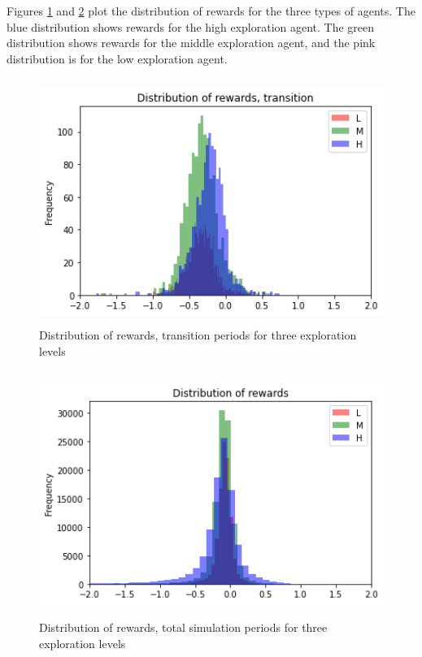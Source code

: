 \documentclass[hidelinks]{article}
\begin{document}
Figures \ref{rewards_t} and \ref{rewards} plot the distribution of rewards for the three types of agents. The blue distribution shows rewards for the high exploration agent. The green distribution shows rewards for the middle exploration agent, and the pink distribution is for the low exploration agent.  

\begin{figure}[H]
	\caption{Distribution of rewards, transition periods for three exploration levels}
	\centerline{\includegraphics[width=12cm,height=8cm]{reward_transition.png}}
	\label{rewards_t}
\end{figure}

\begin{figure}[H]
	\caption{Distribution of rewards, total simulation periods for three exploration levels}
	\centerline{\includegraphics[width=12cm,height=8cm]{reward_all.png}}
	\label{rewards}
\end{figure}
\end{document}
